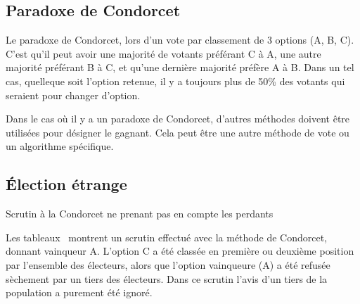 \documentclass[../report]{subfiles}
\begin{document}
  \subsection{Paradoxe de Condorcet}

  Le paradoxe de Condorcet, lors d'un vote par classement de 3 options (A, B, C).
  C'est qu'il peut avoir une majorité de votants préférant C à A, une autre majorité 
  préférant B à C, et qu'une dernière majorité préfère A à B.
  Dans un tel cas, quelleque soit l'option retenue, il y a toujours plus de 50\% des votants
  qui seraient pour changer d'option.

  Dans le cas où il y a un paradoxe de Condorcet, d'autres méthodes doivent être utilisées pour désigner
  le gagnant.
  Cela peut être une autre méthode de vote ou un algorithme spécifique.
  \subsection{Élection étrange}
  \begin{table}[h]
    \begin{center}
      \caption{Scrutin à la Condorcet ne prenant pas en compte les perdants}%
      \label{fig:diff:condorcet:caslim1}
    \end{center}
  \end{table}

  Les tableaux~ montrent un scrutin effectué avec la méthode de Condorcet,
  donnant vainqueur A.
  L'option C a été classée en première ou deuxième position par l'ensemble des électeurs, alors que l'option
  vainqueure (A) a été refusée sèchement par un tiers des électeurs.
  Dans ce scrutin l'avis d'un tiers de la population a purement été ignoré.
\end{document}
